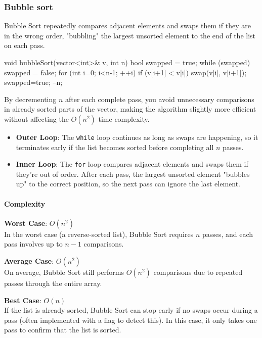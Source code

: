 \documentclass{report}
\begin{document}
\subsubsection{Bubble sort}
\bigbreak \noindent 
Bubble Sort repeatedly compares adjacent elements and swaps them if they are in the wrong order, "bubbling" the largest unsorted element to the end of the list on each pass.
\bigbreak \noindent 
\begin{cppcode}
    void bubbleSort(vector<int>& v, int n) {
        bool swapped = true;
        while (swapped) {
            swapped = false;
            for (int i=0; i<n-1; ++i) {
                if (v[i+1] < v[i]) {
                    swap(v[i], v[i+1]);
                    swapped=true;
                }
            }
            --n;
        }
    }
\end{cppcode}
\bigbreak \noindent 
By decrementing \( n \) after each complete pass, you avoid unnecessary comparisons in already sorted parts of the vector, making the algorithm slightly more efficient without affecting the \( O(n^2) \) time complexity.
\begin{itemize}
    \item \textbf{Outer Loop}: The \texttt{while} loop continues as long as swaps are happening, so it terminates early if the list becomes sorted before completing all \( n \) passes.
    \item \textbf{Inner Loop}: The \texttt{for} loop compares adjacent elements and swaps them if they’re out of order. After each pass, the largest unsorted element "bubbles up" to the correct position, so the next pass can ignore the last element.
\end{itemize}
\pagebreak \bigbreak \noindent 
\paragraph{Complexity}
\bigbreak \noindent \bigbreak \noindent 
\textbf{Worst Case}: \( O(n^2) \) \\
\bigbreak \noindent 
In the worst case (a reverse-sorted list), Bubble Sort requires \( n \) passes, and each pass involves up to \( n - 1 \) comparisons.

\bigbreak \noindent 
\textbf{Average Case}: \( O(n^2) \) \\
\bigbreak \noindent 
On average, Bubble Sort still performs \( O(n^2) \) comparisons due to repeated passes through the entire array.

\bigbreak \noindent 
\textbf{Best Case}: \( O(n) \) \\
\bigbreak \noindent 
If the list is already sorted, Bubble Sort can stop early if no swaps occur during a pass (often implemented with a flag to detect this). In this case, it only takes one pass to confirm that the list is sorted.
\end{document}
